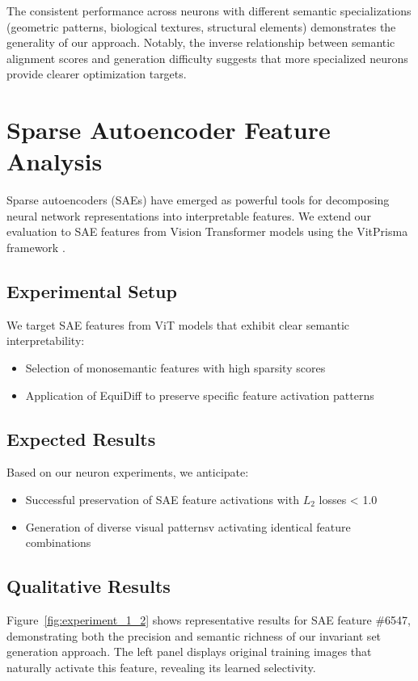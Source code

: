 \documentclass[licencjacka,en]{pracamgr}
\newcommand{\method}[1]{EquiDiff}  %
\begin{document}
The consistent performance across neurons with different semantic specializations (geometric patterns, biological textures, structural elements) demonstrates the generality of our approach. Notably, the inverse relationship between semantic alignment scores and generation difficulty suggests that more specialized neurons provide clearer optimization targets.

\section{Sparse Autoencoder Feature Analysis}

Sparse autoencoders (SAEs) have emerged as powerful tools for decomposing neural network representations into interpretable features. We extend our evaluation to SAE features from Vision Transformer models using the VitPrisma framework \citep{joseph2025prismaopensourcetoolkit}.

\subsection{Experimental Setup}

We target SAE features from ViT models that exhibit clear semantic interpretability:
\begin{itemize}
\item Selection of monosemantic features with high sparsity scores
\item Application of \method{} to preserve specific feature activation patterns
\end{itemize}

\subsection{Expected Results}

Based on our neuron experiments, we anticipate:
\begin{itemize}
\item Successful preservation of SAE feature activations with $L_2$ losses < 1.0
\item Generation of diverse visual patternsv activating identical feature combinations
\end{itemize}

\subsection{Qualitative Results}

Figure~\ref{fig:experiment_1_2} shows representative results for SAE feature \#6547, demonstrating both the precision and semantic richness of our invariant set generation approach. The left panel displays original training images that naturally activate this feature, revealing its learned selectivity.
\end{document}
